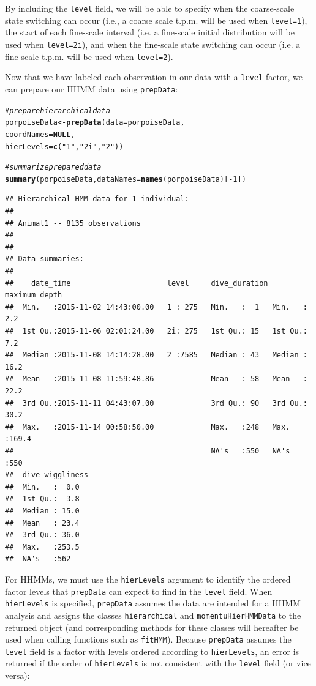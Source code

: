 \documentclass[12pt]{article}\usepackage[]{graphicx}\usepackage[]{xcolor}
\makeatletter
\newcommand{\hlnum}[1]{\textcolor[rgb]{0.686,0.059,0.569}{#1}}%
\newcommand{\hlstr}[1]{\textcolor[rgb]{0.192,0.494,0.8}{#1}}%
\newcommand{\hlcom}[1]{\textcolor[rgb]{0.678,0.584,0.686}{\textit{#1}}}%
\newcommand{\hlopt}[1]{\textcolor[rgb]{0,0,0}{#1}}%
\newcommand{\hlstd}[1]{\textcolor[rgb]{0.345,0.345,0.345}{#1}}%
\newcommand{\hlkwa}[1]{\textcolor[rgb]{0.161,0.373,0.58}{\textbf{#1}}}%
\newcommand{\hlkwb}[1]{\textcolor[rgb]{0.69,0.353,0.396}{#1}}%
\newcommand{\hlkwc}[1]{\textcolor[rgb]{0.333,0.667,0.333}{#1}}%
\newcommand{\hlkwd}[1]{\textcolor[rgb]{0.737,0.353,0.396}{\textbf{#1}}}%
\newenvironment{kframe}{%
 \def\at@end@of@kframe{}%
 \ifinner\ifhmode%
  \def\at@end@of@kframe{\end{minipage}}%
  \begin{minipage}{\columnwidth}%
 \fi\fi%
 \def\FrameCommand##1{\hskip\@totalleftmargin \hskip-\fboxsep
 \colorbox{shadecolor}{##1}\hskip-\fboxsep
     \hskip-\linewidth \hskip-\@totalleftmargin \hskip\columnwidth}%
 \MakeFramed {\advance\hsize-\width
   \@totalleftmargin\z@ \linewidth\hsize
   \@setminipage}}%
 {\par\unskip\endMakeFramed%
 \at@end@of@kframe}
\newenvironment{knitrout}{}{} %
\makeatother
\begin{document}
\noindent By including the \verb|level| field, we will be able to specify when the coarse-scale state switching can occur (i.e., a coarse scale t.p.m. will be used when \verb|level=1|), the start of each fine-scale interval (i.e. a fine-scale initial distribution will be used when \verb|level=2i|), and when the fine-scale state switching can occur (i.e. a fine scale t.p.m. will be used when \verb|level=2|).

Now that we have labeled each observation in our data with a \verb|level| factor, we can prepare our HHMM data using \verb|prepData|:
\begin{knitrout}
\color{fgcolor}\begin{kframe}
\begin{alltt}
\hlcom{# prepare hierarchical data}
\hlstd{porpoiseData} \hlkwb{<-} \hlkwd{prepData}\hlstd{(}\hlkwc{data} \hlstd{= porpoiseData,}
                         \hlkwc{coordNames} \hlstd{=} \hlkwa{NULL}\hlstd{,}
                         \hlkwc{hierLevels} \hlstd{=} \hlkwd{c}\hlstd{(}\hlstr{"1"}\hlstd{,} \hlstr{"2i"}\hlstd{,} \hlstr{"2"}\hlstd{))}

\hlcom{# summarize prepared data}
\hlkwd{summary}\hlstd{(porpoiseData,} \hlkwc{dataNames} \hlstd{=} \hlkwd{names}\hlstd{(porpoiseData)[}\hlopt{-}\hlnum{1}\hlstd{])}
\end{alltt}
\begin{verbatim}
## Hierarchical HMM data for 1 individual:
## 
## Animal1 -- 8135 observations
## 
## 
## Data summaries:
## 
##    date_time                      level     dive_duration maximum_depth  
##  Min.   :2015-11-02 14:43:00.00   1 : 275   Min.   :  1   Min.   :  2.2  
##  1st Qu.:2015-11-06 02:01:24.00   2i: 275   1st Qu.: 15   1st Qu.:  7.2  
##  Median :2015-11-08 14:14:28.00   2 :7585   Median : 43   Median : 16.2  
##  Mean   :2015-11-08 11:59:48.86             Mean   : 58   Mean   : 22.2  
##  3rd Qu.:2015-11-11 04:43:07.00             3rd Qu.: 90   3rd Qu.: 30.2  
##  Max.   :2015-11-14 00:58:50.00             Max.   :248   Max.   :169.4  
##                                             NA's   :550   NA's   :550    
##  dive_wiggliness
##  Min.   :  0.0  
##  1st Qu.:  3.8  
##  Median : 15.0  
##  Mean   : 23.4  
##  3rd Qu.: 36.0  
##  Max.   :253.5  
##  NA's   :562
\end{verbatim}
\end{kframe}
\end{knitrout}
\noindent For HHMMs, we must use the \verb|hierLevels| argument to identify the ordered factor levels that \verb|prepData| can expect to find in the \verb|level| field. When \verb|hierLevels| is specified, \verb|prepData| assumes the data are intended for a HHMM analysis and assigns the classes \verb|hierarchical| and \verb|momentuHierHMMData| to the returned object (and corresponding methods for these classes will hereafter be used when calling functions such as \verb|fitHMM|). Because \verb|prepData| assumes the \verb|level| field is a factor with levels ordered according to \verb|hierLevels|, an error is returned if the order of \verb|hierLevels| is not consistent with the \verb|level| field (or vice versa): 
\end{document}
